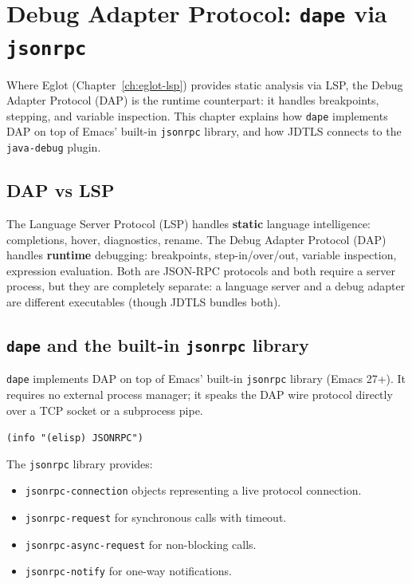 \chapter{Debug Adapter Protocol: \texttt{dape} via \texttt{jsonrpc}}
\label{ch:dape}
\minitoc\label{debug-adapter-protocol-dape-via-jsonrpc}

Where Eglot (Chapter~\ref{ch:eglot-lsp}) provides static analysis
via LSP, the Debug Adapter Protocol (DAP) is the runtime counterpart:
it handles breakpoints, stepping,
and variable inspection.  This chapter explains how \texttt{dape}
implements DAP on top of Emacs' built-in \texttt{jsonrpc} library,
and how JDTLS connects to the \texttt{java-debug} plugin.

\section{DAP vs LSP}\label{dap-vs-lsp}

The Language Server Protocol (LSP) handles \textbf{static} language intelligence: completions, hover, diagnostics, rename. The Debug Adapter Protocol (DAP) handles \textbf{runtime} debugging: breakpoints, step-in/over/out, variable inspection, expression evaluation. Both are JSON-RPC protocols and both require a server process, but they are completely separate: a language server and a debug adapter are different executables (though JDTLS bundles both).

\section{\texttt{dape} and the built-in \texttt{jsonrpc} library}\label{dape-and-the-built-in-jsonrpc-library}

\texttt{dape} implements DAP on top of Emacs' built-in \texttt{jsonrpc} library (Emacs 27+). It requires no external process manager; it speaks the DAP wire protocol directly over a TCP socket or a subprocess pipe.

\texttt{(info "(elisp) JSONRPC")}

The \texttt{jsonrpc} library provides:

\begin{itemize}
\item \texttt{jsonrpc-connection} objects representing a live protocol connection.
\item \texttt{jsonrpc-request} for synchronous calls with timeout.
\item \texttt{jsonrpc-async-request} for non-blocking calls.
\item \texttt{jsonrpc-notify} for one-way notifications.
\end{itemize}


